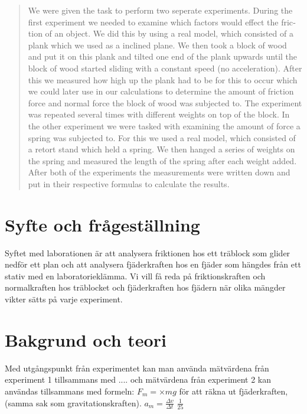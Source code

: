 \documentclass[11p, titlepage, oneside, a4paper]{article}
\begin{document}
    \begin{otherlanguage}{english}
	\begin{abstract}
        We were given the task to perform two seperate experiments. During the first experiment we needed to examine which factors would effect the friction of an object. We did this by using a real model, which consisted of a plank which we used as a inclined plane. We then took a block of wood and put it on this plank and tilted one end of the plank upwards until the block of wood started sliding with a constant speed (no acceleration). After this we measured how high up the plank had to be for this to occur which we could later use in our calculations to determine the amount of friction force and normal force the block of wood was subjected to. The experiment was repeated several times with different weights on top of the block. In the other experiment we were tasked with examining the amount of force a spring was subjected to. For this we used a real model, which consisted of a retort stand which held a spring. We then hanged a series of weights on the spring and measured the length of the spring after each weight added. After both of the experiments the measurements were written down and put in their respective formulas to calculate the results.
    \end{abstract}
    \end{otherlanguage}
	\tableofcontents
	
	\newpage

	
	\setlength{\parindent}{0pt}
	\setlength{\parskip}{10pt}
	
	\section{Syfte och frågeställning}
		Syftet med laborationen är att analysera friktionen hos ett träblock som glider nedför ett plan och att analysera fjäderkraften hos en fjäder som hängdes från ett stativ med en laboratorieklämma. Vi vill få reda på friktionskraften och normalkraften hos träblocket och fjäderkraften hos fjädern när olika mängder vikter sätts på varje experiment.

	\section{Bakgrund och teori}
        Med utgångspunkt från experimentet kan man använda mätvärdena från experiment 1 tillsammans med .... och mätvärdena från experiment 2 kan användas tillsammans med formeln: $F_m = \times{m}{g}$ för att räkna ut fjäderkraften, (samma sak som gravitationskraften). $a_m = \frac{\Delta v}{\Delta t}$  $\frac{1}{25}$
	
\end{document}
